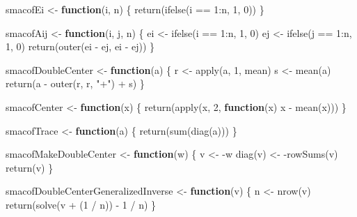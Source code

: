 \documentclass[
  12pt,
  letterpaper,
  DIV=11,
  numbers=noendperiod]{scrartcl}
\newenvironment{Shaded}{\begin{snugshade}}{\end{snugshade}}
\newcommand{\ControlFlowTok}[1]{\textcolor[rgb]{0.00,0.23,0.31}{\textbf{#1}}}
\newcommand{\DecValTok}[1]{\textcolor[rgb]{0.68,0.00,0.00}{#1}}
\newcommand{\FunctionTok}[1]{\textcolor[rgb]{0.28,0.35,0.67}{#1}}
\newcommand{\NormalTok}[1]{\textcolor[rgb]{0.00,0.23,0.31}{#1}}
\newcommand{\OtherTok}[1]{\textcolor[rgb]{0.00,0.23,0.31}{#1}}
\newcommand{\SpecialCharTok}[1]{\textcolor[rgb]{0.37,0.37,0.37}{#1}}
\newcommand{\StringTok}[1]{\textcolor[rgb]{0.13,0.47,0.30}{#1}}
\begin{document}
\begin{Shaded}
\begin{Highlighting}[]
\NormalTok{smacofEi }\OtherTok{\textless{}{-}} \ControlFlowTok{function}\NormalTok{(i, n) \{}
  \FunctionTok{return}\NormalTok{(}\FunctionTok{ifelse}\NormalTok{(i }\SpecialCharTok{==} \DecValTok{1}\SpecialCharTok{:}\NormalTok{n, }\DecValTok{1}\NormalTok{, }\DecValTok{0}\NormalTok{))}
\NormalTok{\}}

\NormalTok{smacofAij }\OtherTok{\textless{}{-}} \ControlFlowTok{function}\NormalTok{(i, j, n) \{}
\NormalTok{  ei }\OtherTok{\textless{}{-}} \FunctionTok{ifelse}\NormalTok{(i }\SpecialCharTok{==} \DecValTok{1}\SpecialCharTok{:}\NormalTok{n, }\DecValTok{1}\NormalTok{, }\DecValTok{0}\NormalTok{)}
\NormalTok{  ej }\OtherTok{\textless{}{-}} \FunctionTok{ifelse}\NormalTok{(j }\SpecialCharTok{==} \DecValTok{1}\SpecialCharTok{:}\NormalTok{n, }\DecValTok{1}\NormalTok{, }\DecValTok{0}\NormalTok{)}
  \FunctionTok{return}\NormalTok{(}\FunctionTok{outer}\NormalTok{(ei }\SpecialCharTok{{-}}\NormalTok{ ej, ei }\SpecialCharTok{{-}}\NormalTok{ ej))}
\NormalTok{\}}

\NormalTok{smacofDoubleCenter }\OtherTok{\textless{}{-}} \ControlFlowTok{function}\NormalTok{(a) \{}
\NormalTok{  r }\OtherTok{\textless{}{-}} \FunctionTok{apply}\NormalTok{(a, }\DecValTok{1}\NormalTok{, mean)}
\NormalTok{  s }\OtherTok{\textless{}{-}} \FunctionTok{mean}\NormalTok{(a)}
  \FunctionTok{return}\NormalTok{(a }\SpecialCharTok{{-}} \FunctionTok{outer}\NormalTok{(r, r, }\StringTok{"+"}\NormalTok{) }\SpecialCharTok{+}\NormalTok{ s)}
\NormalTok{\}}

\NormalTok{smacofCenter }\OtherTok{\textless{}{-}} \ControlFlowTok{function}\NormalTok{(x) \{}
  \FunctionTok{return}\NormalTok{(}\FunctionTok{apply}\NormalTok{(x, }\DecValTok{2}\NormalTok{, }\ControlFlowTok{function}\NormalTok{(x) x }\SpecialCharTok{{-}} \FunctionTok{mean}\NormalTok{(x)))}
\NormalTok{\}}

\NormalTok{smacofTrace }\OtherTok{\textless{}{-}} \ControlFlowTok{function}\NormalTok{(a) \{}
  \FunctionTok{return}\NormalTok{(}\FunctionTok{sum}\NormalTok{(}\FunctionTok{diag}\NormalTok{(a)))}
\NormalTok{\}}

\NormalTok{smacofMakeDoubleCenter }\OtherTok{\textless{}{-}} \ControlFlowTok{function}\NormalTok{(w) \{}
\NormalTok{  v }\OtherTok{\textless{}{-}} \SpecialCharTok{{-}}\NormalTok{w}
  \FunctionTok{diag}\NormalTok{(v) }\OtherTok{\textless{}{-}} \SpecialCharTok{{-}}\FunctionTok{rowSums}\NormalTok{(v)}
  \FunctionTok{return}\NormalTok{(v)}
\NormalTok{\}}

\NormalTok{smacofDoubleCenterGeneralizedInverse }\OtherTok{\textless{}{-}} \ControlFlowTok{function}\NormalTok{(v) \{}
\NormalTok{  n }\OtherTok{\textless{}{-}} \FunctionTok{nrow}\NormalTok{(v)}
  \FunctionTok{return}\NormalTok{(}\FunctionTok{solve}\NormalTok{(v }\SpecialCharTok{+}\NormalTok{ (}\DecValTok{1} \SpecialCharTok{/}\NormalTok{ n)) }\SpecialCharTok{{-}} \DecValTok{1} \SpecialCharTok{/}\NormalTok{ n)}
\NormalTok{\}}
\end{Highlighting}
\end{Shaded}
\end{document}
